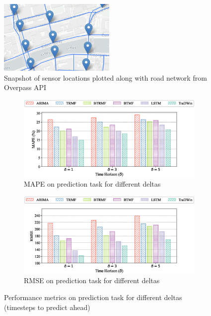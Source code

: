 \begin{figure}[t]
  \centering
  \includegraphics[width=0.5\textwidth]{dataset.png}
  \caption{Snapshot of sensor locations plotted along with road network from Overpass API}
  \label{fig:dataset}
\end{figure}
\begin{figure}[]
  \centering
  \begin{subfigure}[b]{0.4\textwidth}
      \centering
      \includegraphics[width=\textwidth]{mape_pred.eps}
      \caption{MAPE on prediction task for different deltas}
      \label{fig:mape_pred}
  \end{subfigure}
  \begin{subfigure}[b]{0.4\textwidth}
      \centering
      \includegraphics[width=\textwidth]{rmse_pred.eps}
      \caption{RMSE on prediction task for different deltas}
      \label{fig:rmse_pred}
  \end{subfigure}
  
  \caption{Performance metrics on prediction task for different deltas (timesteps to predict ahead)}
  \label{fig:pred_metrics}
\end{figure}
